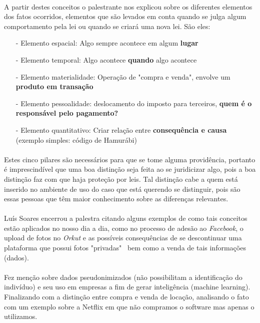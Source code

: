 \documentclass[12pt]{article}
\begin{document}
	\paragraph{}
		A partir destes conceitos o palestrante nos explicou sobre os	
		diferentes elementos dos fatos ocorridos, elementos que são
		levados em conta quando se julga algum comportamento pela
		lei ou quando se criará uma nova lei. São eles:
		\begin{itemize}
			\item[-]
				Elemento espacial: Algo sempre acontece em algum \textbf{lugar}
			\item[-]
				Elemento temporal: Algo acontece \textbf{quando} algo acontece
			\item[-]
				Elemento materialidade: Operação de "compra e venda", envolve
				um \textbf{produto em transação}
			\item[-]
				Elemento pessoalidade: deslocamento do imposto para terceiros,
				\textbf{quem é o responsável pelo pagamento?}
			\item[-]
				Elemento quantitativo: Criar relação entre \textbf{consequência e 
				causa} (exemplo simples: código de Hamurábi)
		\end{itemize}
	\paragraph{}
		Estes cinco pilares são necessários para que se tome alguma providência,
		portanto é imprescindível que uma boa distinção seja feita ao se
		juridicizar algo, pois a boa distinção faz com que haja proteção por leis.
		Tal distinção cabe a quem está inserido no ambiente de uso do
		caso que está querendo se distinguir, pois são essas pessoas que têm
		maior conhecimento sobre as diferenças relevantes.
	\paragraph{}
		Luís Soares encerrou a palestra citando alguns exemplos de como
		tais conceitos estão aplicados no nosso dia a dia, como no processo
		de adesão ao \textit{Facebook}, o upload de fotos no \textit{Orkut} e
		as possíveis consequências de se descontinuar uma plataforma que 
		possui fotos "privadas"  \ bem como a venda de tais informações (dados).
	\paragraph{}
		Fez menção sobre dados pseudonimizados (não possibilitam a identificação 
		do indivíduo) e seu uso em empresas a fim de gerar inteligência (machine
		learning). Finalizando com a distinção entre compra e venda de locação, 
		analisando o fato com um exemplo sobre a Netflix em que não compramos
		o software mas apenas o utilizamos.
\end{document}
